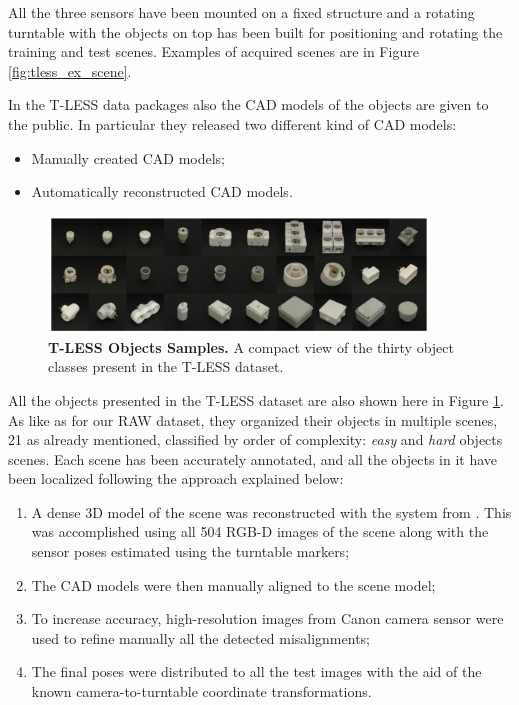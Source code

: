 All the three sensors have been mounted on a fixed structure and a rotating turntable with the objects on top has been built for positioning and rotating the training and test scenes. Examples of acquired scenes are in Figure \ref{fig:tless_ex_scene}.

In the T-LESS data packages also the CAD models of the objects are given to the public. In particular they released two different kind of CAD models:

\begin{itemize}
	\item Manually created CAD models;
	\item Automatically reconstructed CAD models.
\end{itemize}


\begin{figure}
    \centering
    \includegraphics[width=0.9\textwidth]{figures/2_benchmarks_and_metrics/tless_objs_ex}
    \caption{\textbf{T-LESS Objects Samples.} A compact view of the thirty object classes present in the T-LESS dataset.}
    \label{fig:tless_objs_ex}
\end{figure}

All the objects presented in the T-LESS dataset are also shown here in Figure \ref{fig:tless_objs_ex}. As like as for our RAW dataset, they organized their objects in multiple scenes, 21 as already mentioned, classified by order of complexity: \emph{easy} and \emph{hard} objects scenes. Each scene has been accurately annotated, and all the objects in it have been localized following the approach explained below:

\begin{enumerate}
	\item A dense 3D model of the scene was reconstructed with the system from \cite{steinbrucker2014volumetric}. This was accomplished using all 504 RGB-D images of the scene along with the sensor poses estimated using the turntable markers;
	\item The CAD models were then manually aligned to the scene model;
	\item To increase accuracy, high-resolution images from Canon camera sensor were used to refine manually all the detected misalignments;
	\item The final poses were distributed to all the test images with the aid of the known camera-to-turntable coordinate transformations.
\end{enumerate}

